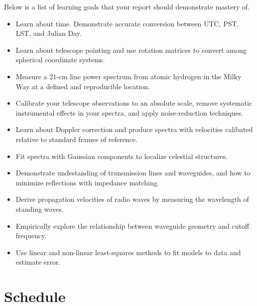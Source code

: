 \documentclass[11pt,preprint]{aastex}
\begin{document}
Below is a list of learning goals that your report should demonstrate mastery of.

\begin{itemize}

\item Learn about time. Demonstrate accurate conversion between UTC, PST, LST,
and Julian Day.

\item Learn about telescope pointing and use rotation matrices to convert among spherical
  coordinate systems.

\item Measure a 21-cm line power spectrum from atomic hydrogen in the
  Milky Way at a defined and reproducible location.

\item Calibrate your telescope observations to an absolute scale, remove
systematic instrumental effects in your spectra, and apply noise-reduction
techniques.

\item Learn about Doppler correction and produce spectra with velocities 
calibated relative to standard frames of reference.

\item Fit spectra with Gaussian components to localize celestial structures.

\item Demonstrate undestanding of transmission lines and waveguides, and 
how to minimize reflections with impedance matching.

\item Derive propagation velocities of radio waves by measuring the wavelength of
  standing waves.

\item Empirically explore the relationship between waveguide geometry and cutoff frequency.

\item Use linear and non-linear least-squares methods to fit models to data and
estimate error.

\end{itemize}

\section{Schedule}
\end{document}
